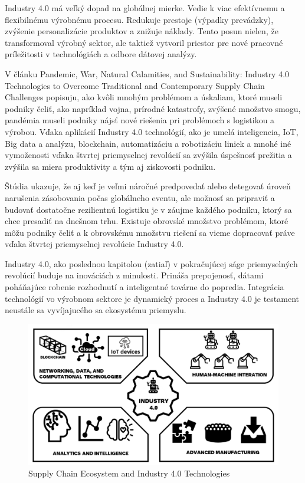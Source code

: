 Industry 4.0 má veľký dopad na globálnej mierke. Vedie k viac efektívnemu a flexibilnému výrobnému procesu. Redukuje prestoje (výpadky prevádzky), zvýšenie personalizácie produktov a znižuje náklady. Tento posun nielen, že transformoval výrobný sektor, ale taktiež vytvoril priestor pre nové pracovné príležitosti v technológiách a odbore dátovej analýzy. \cite{rajan2023industry40}

V článku Pandemic, War, Natural Calamities, and Sustainability: Industry 4.0 Technologies to Overcome Traditional and Contemporary Supply Chain Challenges popisuju, ako kvôli mnohým problémom a úskaliam, ktoré museli podniky čeliť, ako napríklad vojna, prírodné katastrofy, zvýšené množstvo smogu, pandémia museli podniky nájsť nové riešenia pri problémoch s logistikou a výrobou. Vďaka aplikácií Industry 4.0 technológií, ako je umelá inteligencia, IoT, Big data a analýzu, blockchain, automatizáciu a robotizáciu liniek a mnohé iné vymoženosti vďaka štvrtej priemyselnej revolúcií sa zvýšila úspešnosť prežitia a zvýšila sa miera produktivity a tým aj ziskovosti podniku.

Štúdia ukazuje, že aj keď je veľmi náročné predpovedať alebo detegovať úroveň narušenia zásobovania počas globálneho eventu, ale možnosť sa pripraviť a budovať dostatočne rezilientnú logistiku je v záujme každého podniku, ktorý sa chce presadiť na dnešnom trhu. Existuje obrovské množstvo problémom, ktoré môžu podniky čeliť a k obrovskému množstvu riešení sa vieme dopracovať práve vďaka štvrtej priemyselnej revolúcie Industry 4.0. \cite{rajasanthi2022industry40}

Industry 4.0, ako poslednou kapitolou (zatiaľ) v pokračujúcej ságe priemyselných revolúcií buduje na inováciách z minulosti. Prináša prepojenosť, dátami poháňajúce robenie rozhodnutí a inteligentné továrne do popredia. Integrácia technológií vo výrobnom sektore je dynamický proces a Industry 4.0 je testament neustále sa vyvíjajucého sa ekosystému priemyslu. \cite{rajan2023industry40}

\begin{figure}[h]
    \centering
    \includegraphics[width=1\textwidth]{img/logistics-06-00081-g003.png}
    \caption{Supply Chain Ecosystem and Industry 4.0 Technologies \cite{rajasanthi2022industry40}}
    \label{fig:industry40}
\end{figure}

